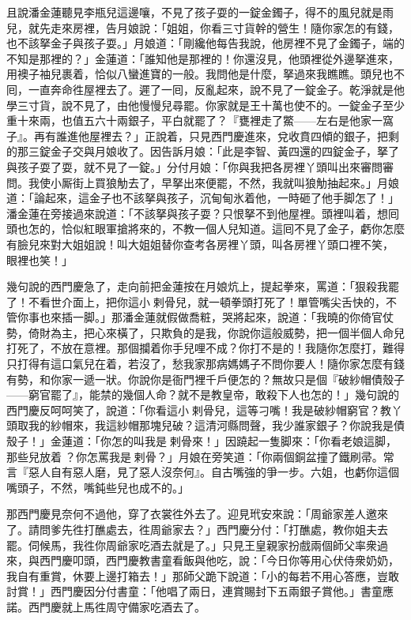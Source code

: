 且說潘金蓮聽見李瓶兒這邊嚷，不見了孩子耍的一錠金鐲子，得不的風兒就是雨兒，就先走來房裡，告月娘說：「姐姐，你看三寸貨幹的營生！隨你家怎的有錢，也不該拏金子與孩子耍。」月娘道：「剛纔他每告我說，他房裡不見了金鐲子，端的不知是那裡的？」金蓮道：「誰知他是那裡的！你還沒見，他頭裡從外邊拏進來，用襖子袖兒裹着，恰似八蠻進寶的一般。{}我問他是什麼，拏過來我瞧瞧。頭兒也不囘，一直奔命徃屋裡去了。遲了一囘，反亂起來，說不見了一錠金子。乾淨就是他學三寸貨，說不見了，由他慢慢兒尋罷。你家就是王十萬也使不的。一錠金子至少重十來兩，也值五六十兩銀子，平白就罷了？『甕裡走了鱉——左右是他家一窩子』。再有誰進他屋裡去？」正說着，只見西門慶進來，兌收賁四傾的銀子，把剩的那三錠金子交與月娘收了。因告訴月娘：「此是李智、黃四還的四錠金子，拏了與孩子耍了耍，就不見了一錠。」分付月娘：「你與我把各房裡丫頭叫出來審問審問。我使小厮街上買狼觔去了，早拏出來便罷，不然，我就叫狼觔抽起來。」{}月娘道：「論起來，這金子也不該拏與孩子，沉甸甸氷着他，一時砸了他手脚怎了！」潘金蓮在旁接過來說道：{}「不該拏與孩子耍？只恨拏不到他屋裡。頭裡叫着，想囘頭也怎的，恰似紅眼軍搶將來的，不教一個人兒知道。這囘不見了金子，虧你怎麼有臉兒來對大姐姐說！叫大姐姐替你查考各房裡丫頭，叫各房裡丫頭口裡不笑，𣭈眼裡也笑！」

幾句說的西門慶急了，走向前把金蓮按在月娘炕上，提起拳來，罵道：「狠殺我罷了！不看世介面上，把你這小𢱉剌骨兒，就一頓拳頭打死了！單管嘴尖舌快的，不管你事也來插一脚。」那潘金蓮就假做喬粧，哭將起來，說道：「我曉的你倚官仗勢，倚財為主，把心來橫了，只欺負的是我，你說你這般威勢，把一個半個人命兒打死了，不放在意裡。那個攔着你手兒哩不成？你打不是的！我隨你怎麼打，難得只打得有這口氣兒在着，若沒了，愁我家那病媽媽子不問你要人！隨你家怎麼有錢有勢，和你家一遞一狀。你說你是衙門裡千戶便怎的？無故只是個『破紗帽債殼子——窮官罷了』，能禁的幾個人命？就不是教皇帝，敢殺下人也怎的！」{}幾句說的西門慶反呵呵笑了，說道：「你看這小𢱉剌骨兒，這等刁嘴！我是破紗帽窮官？教丫頭取我的紗帽來，我這紗帽那塊兒破？這清河縣問聲，我少誰家銀子？你說我是債殼子！」金蓮道：「你怎的叫我是𢱉剌骨來！」因蹺起一隻脚來：「你看老娘這脚，那些兒放着𢱉？你怎罵我是𢱉剌骨？」月娘在旁笑道：「你兩個銅盆撞了鐵刷帚。常言『惡人自有惡人磨，見了惡人沒奈何』。自古嘴強的爭一步。六姐，也虧你這個嘴頭子，不然，嘴鈍些兒也成不的。」

那西門慶見奈何不過他，穿了衣裳徃外去了。迎見玳安來說：「周爺家差人邀來了。請問爹先徃打醮處去，徃周爺家去？」西門慶分付：「打醮處，教你姐夫去罷。伺候馬，我徃你周爺家吃酒去就是了。」只見王皇親家扮戲兩個師父率衆過來，與西門慶叩頭，西門慶教書童看飯與他吃，說：「今日你等用心伏侍衆奶奶，我自有重賞，休要上邊打箱去！」那師父跪下說道：「小的每若不用心答應，豈敢討賞！」西門慶因分付書童：「他唱了兩日，連賞賜封下五兩銀子賞他。」書童應諾。西門慶就上馬徃周守備家吃酒去了。

